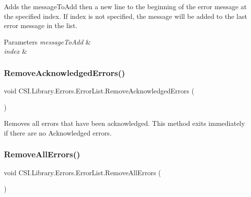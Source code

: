Adds the message\+To\+Add then a new line to the beginning of the error message at the specified index. If index is not specified, the message will be added to the last error message in the list. 


\begin{DoxyParams}{Parameters}
{\em message\+To\+Add} & \\
\hline
{\em index} & \\
\hline
\end{DoxyParams}
\mbox{\label{class_c_s_i_1_1_library_1_1_errors_1_1_error_list_a14fbdd40776f810b051edb6d5049e0a9}} 
\subsubsection{\texorpdfstring{RemoveAcknowledgedErrors()}{RemoveAcknowledgedErrors()}}
{\footnotesize\ttfamily void C\+S\+I.\+Library.\+Errors.\+Error\+List.\+Remove\+Acknowledged\+Errors (\begin{DoxyParamCaption}{ }\end{DoxyParamCaption})\hspace{0.3cm}{\ttfamily [inline]}}



Removes all errors that have been acknowledged. This method exits immediately if there are no Acknowledged errors. 

\mbox{\label{class_c_s_i_1_1_library_1_1_errors_1_1_error_list_ad9bda10b1e69ab8218cbb6d78b8bdb60}} 
\subsubsection{\texorpdfstring{RemoveAllErrors()}{RemoveAllErrors()}}
{\footnotesize\ttfamily void C\+S\+I.\+Library.\+Errors.\+Error\+List.\+Remove\+All\+Errors (\begin{DoxyParamCaption}{ }\end{DoxyParamCaption})\hspace{0.3cm}{\ttfamily [inline]}}



